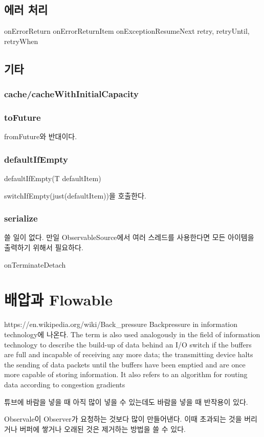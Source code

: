 \documentclass{book}
\begin{document}
{\section{에러 처리}
onErrorReturn
onErrorReturnItem
onExceptionResumeNext
retry, retryUntil, retryWhen

\section{기타}
\subsection{cache/cacheWithInitialCapacity}
\subsection{toFuture}
fromFuture와 반대이다.

\subsection{defaultIfEmpty}
defaultIfEmpty(T defaultItem)

switchIfEmpty(just(defaultItem))을 호출한다.

\subsection{serialize}
쓸 일이 없다. 만일 ObservableSource에서 여러 스레드를 사용한다면 모든 아이템을 출력하기 위해서 필요하다.

onTerminateDetach


\chapter{배압과 Flowable}
https://en.wikipedia.org/wiki/Back_pressure
Backpressure in information technology에 나온다.
The term is also used analogously in the field of information technology to describe the build-up of data behind an I/O switch if the buffers are full and incapable of receiving any more data; the transmitting device halts the sending of data packets until the buffers have been emptied and are once more capable of storing information. It also refers to an algorithm for routing data according to congestion gradients

튜브에 바람을 넣을 때 아직 많이 넣을 수 있는데도 바람을 넣을 때 반작용이 있다.

Observale이 Observer가 요청하는 것보다 많이 만들어낸다.
이때 초과되는 것을 버리거나 버퍼에 쌓거나 오래된 것은 제거하는 방법을 쓸 수 있다.

}
\end{document}
